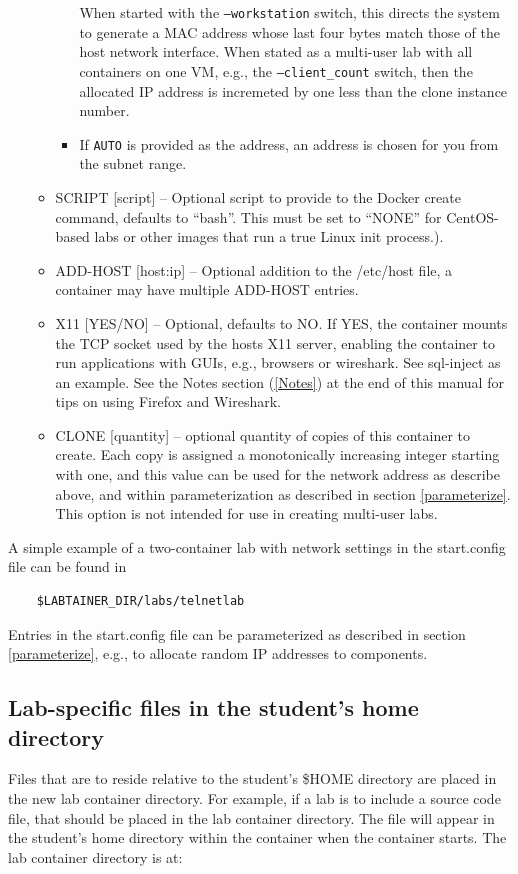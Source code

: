 \documentclass[12pt]{article}
\begin{document}
\begin{itemize}
\begin{itemize}
\begin{itemize}
When started with the {\tt --workstation} switch, this directs the system to generate a MAC address whose last four bytes match 
those of the host network interface.  When stated as a multi-user lab with all containers on one VM, e.g., the 
{\tt --client\_count} switch, then the allocated IP address is incremeted by one less than the clone instance number.
\item If {\tt AUTO} is provided as the address, an address is chosen for you from the subnet range.  
\end{itemize}
\item SCRIPT [script] -- Optional script to provide to the Docker create command, defaults to ``bash''.  This must be set to
``NONE'' for CentOS-based labs or other images that run a true Linux init process.).
\item ADD-HOST [host:ip] -- Optional addition to the /etc/host file, a container may have multiple ADD-HOST entries.
\item X11 [YES/NO] -- Optional, defaults to NO.  If YES, the container mounts the TCP socket used by the hosts X11 server,
enabling the container to run applications with GUIs, e.g., browsers or wireshark.  See sql-inject as an example.  See the
Notes section (\ref{Notes}) at the end of this manual for tips on using Firefox and Wireshark.
\item CLONE [quantity] -- optional quantity of copies of this container to create. Each copy is assigned a monotonically
increasing integer starting with one, and this value can be used for the network address as describe above, and within
parameterization as described in section \ref{parameterize}. This option is not intended for use in creating multi-user
labs.

\end{itemize}
\end{itemize}
  
A simple example of a two-container lab with network settings in the start.config file can be found in 
\begin{verbatim}
    $LABTAINER_DIR/labs/telnetlab
\end{verbatim}
Entries in the start.config file can be parameterized as described in section \ref{parameterize}, e.g., to allocate
random IP addresses to components.


\subsection {Lab-specific files in the student's home directory}
\label{home files}
Files that are to reside relative to the student's \$HOME directory are placed in the 
new lab container directory.  For example, if a lab is to include a source code file, that
should be placed in the lab container directory. The file will appear in the student's
home directory within the container when the container starts.  The lab container
directory is at:  
\end{document}
